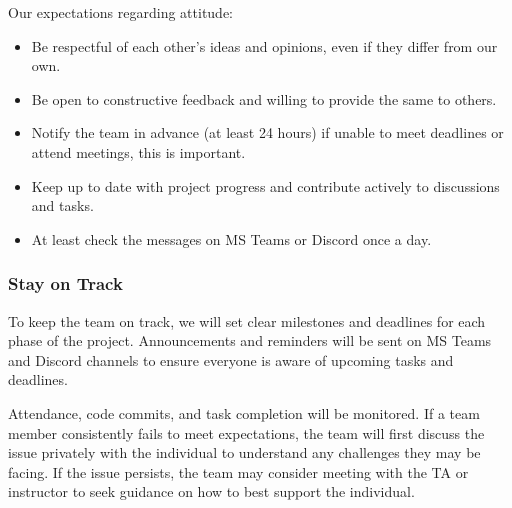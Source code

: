 \documentclass{article}
\begin{document}

Our expectations regarding attitude:
\begin{itemize}
  \item Be respectful of each other's ideas and opinions, even if they differ from our own.
  \item Be open to constructive feedback and willing to provide the same to others.
  \item Notify the team in advance (at least 24 hours) if unable to meet deadlines or attend meetings, this is important.
  \item Keep up to date with project progress and contribute actively to discussions and tasks.
  \item At least check the messages on MS Teams or Discord once a day.
\end{itemize}

\subsubsection*{Stay on Track}



To keep the team on track, we will set clear milestones and deadlines for each phase of the project.
Announcements and reminders will be sent on MS Teams and Discord channels
to ensure everyone is aware of upcoming tasks and deadlines.

Attendance, code commits, and task completion will be monitored. 
If a team member consistently fails to meet expectations, the team will first discuss the issue privately 
with the individual to understand any challenges they may be facing. If the issue persists, 
the team may consider meeting with the TA or instructor to seek guidance on how to best support the individual.
\end{document}
